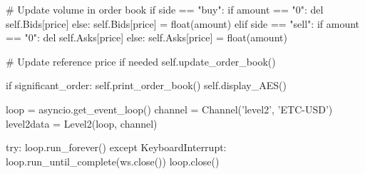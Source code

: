                 # Update volume in order book    
                if side == "buy":
                    if amount == "0":
                        del self.Bids[price]
                    else:
                        self.Bids[price] = float(amount)
                elif side == "sell":
                    if amount == "0":
                        del self.Asks[price]
                    else:
                        self.Asks[price] = float(amount)
                        
            # Update reference price if needed   
            self.update_order_book()
            
            if significant_order:
                self.print_order_book()
                self.display_AES()
                
            
            
loop = asyncio.get_event_loop()
channel = Channel('level2', 'ETC-USD')
level2data = Level2(loop, channel)

try:
    loop.run_forever()
except KeyboardInterrupt:
    loop.run_until_complete(ws.close())
    loop.close()